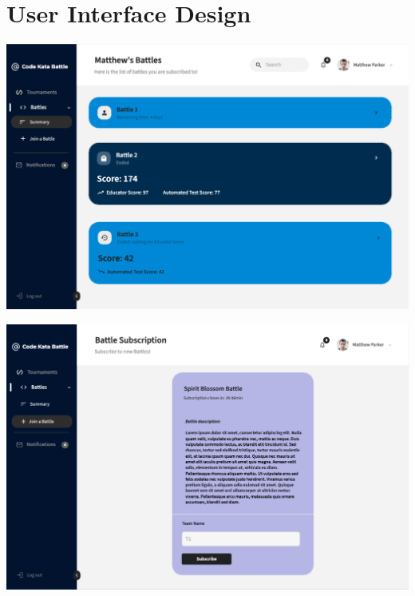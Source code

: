 \documentclass{article}
\begin{document}
\newpage
\section{User Interface Design}
\begin{center}
  \includegraphics[width=\linewidth]{mok1.png}
\label{fig:mk1}
\end{center}

\begin{center}
  \includegraphics[width=\linewidth]{mok2.png}
\label{fig:mk2}
\end{center}
\end{document}
